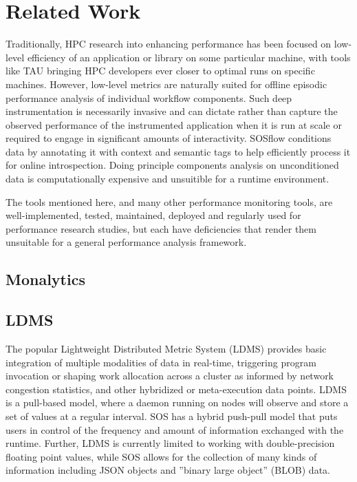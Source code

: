 
\section{Related Work}
%
Traditionally, HPC research into enhancing performance has been
focused on low-level efficiency of an application or library on some
particular machine, with tools like TAU bringing HPC developers ever
closer to optimal runs on specific machines.
%
However, low-level metrics are naturally suited for offline episodic
performance analysis of individual workflow components.
%
Such deep instrumentation is necessarily invasive and can dictate
rather than capture the observed performance of the instrumented
application when it is run at scale or required to engage in
significant amounts of interactivity.
%
SOSflow conditions data by annotating it with context and semantic tags to
help efficiently process it for online introspection.
%
Doing principle components analysis on unconditioned data is
computationally expensive and unsuitible for a runtime environment.
%
\par
%
The tools mentioned here, and many other performance monitoring tools, are
well-implemented, tested, maintained, deployed and regularly used for
performance research studies, but each have deficiencies that render them
unsuitable for a general performance analysis framework. %


\subsection{Monalytics} %
%
%
\subsection{LDMS} %
%
The popular Lightweight Distributed Metric System (LDMS)
\cite{agelastos2014lightweight} provides basic integration of multiple
modalities of data in real-time, triggering program invocation or
shaping work allocation across a cluster as informed by network
congestion statistics, and other hybridized or meta-execution data
points.
%
LDMS is a pull-based model, where a daemon running on nodes will
observe and store a set of values at a regular interval.
%
SOS has a hybrid push-pull model that puts users in control of the
frequency and amount of information exchanged with the runtime.
%
Further, LDMS is currently limited to working with double-precision
floating point values, while SOS allows for the collection of many
kinds of information including JSON objects and ''binary large
object'' (BLOB) data.
%
